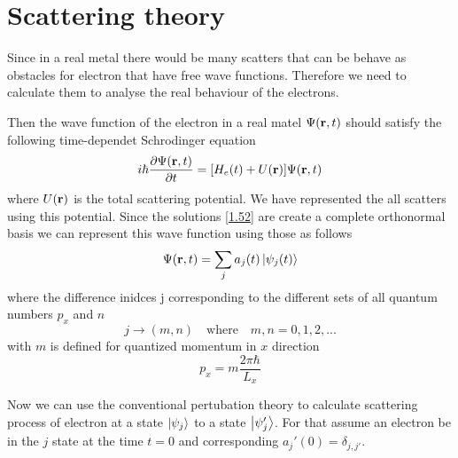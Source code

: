 \section{Scattering theory}

Since in a real metal there would be many scatters that can be behave as obstacles for electron that have free wave functions. Therefore we need to calculate them to analyse the real behaviour of the electrons.

\noindent
Then the wave function of the electron in a real matel $\Psi(\vb{r},t)$ should satisfy the following time-dependet Schrodinger equation
\begin{equation} \label{2.1}
  i \hbar \pdv{\Psi(\vb{r},t)}{t} = [H_e(t) + U(\vb{r})] \Psi(\vb{r},t)
\end{equation}
where $U(\vb{r})$ is the total scattering potential. We have represented the all scatters using this potential. Since the solutions \eqref{1.52} are create a complete orthonormal basis we can represent this wave function using those as follows
\begin{equation} \label{2.2}
  \Psi(\vb{r},t) = \sum_j a_j(t) \ket{\psi_j(t)}
\end{equation}
where the difference inidces j corresponding to the different sets of all quantum numbers $p_x$ and $n$
\begin{equation} \label{2.3}
  j \rightarrow (m,n) \quad \text{where} \quad
  m,n =0,1,2,...
\end{equation}
with $m$ is defined for quantized momentum in $x$ direction
\begin{equation} \label{2.4}
  p_x = m \frac{2\pi \hbar}{L_x}
\end{equation}

\noindent
Now we can use the conventional pertubation theory to calculate scattering process of electron at a state $\ket{\psi_j}$ to a state $\ket{\psi_j'}$. For that assume an electron be in the $j$ state at the time $t=0$ and corresponding $a_j'(0) = \delta_{j,j'}$.

